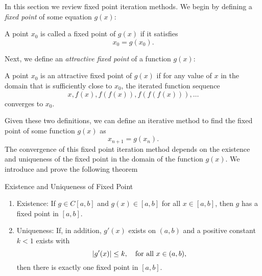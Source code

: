 In this section we review fixed point iteration methods. We begin by defining a \textit{fixed point} of some equation $g(x)$:
\begin{definition}
A point $x_{0}$ is called a fixed point of $g(x)$ if it satisfies
\begin{equation}
	x_{0} = g(x_{0}).
\end{equation}
\end{definition}
Next, we define an \textit{attractive fixed point} of a function $g(x)$:
\begin{definition}
A point $x_{0}$ is an attractive fixed point of $g(x)$ if for any value of $x$ in the domain that is sufficiently close to $x_{0}$, the iterated function sequence
\begin{equation}
	x, f(x), f(f(x)), f(f(f(x))), \dots
\end{equation}
converges to $x_{0}$.
\end{definition}
Given these two definitions, we can define an iterative method to find the fixed point of some function $g(x)$ as
\begin{equation}
x_{n+1} = g(x_{n}).
\end{equation}
The convergence of this fixed point iteration method depends on the existence and uniqueness of the fixed point in the domain of the function $g(x)$. We introduce and prove the following theorem
\begin{theorem}{Existence and Uniqueness of Fixed Point}
	\begin{enumerate}
		\item Existence: If $g \in C[a,b]$ and $g(x) \in [a,b]$ for all $x \in [a,b]$, then $g$ has a fixed point in $[a,b]$.
		\item Uniqueness: If, in addition, $g'(x)$ exists on $(a,b)$ and a positive constant $k < 1$ exists with
			\begin{equation*}
				\lvert g'(x)\rvert \leq k, \quad \text{for all } x \in (a,b),
			\end{equation*}
			then there is exactly one fixed point in $[a,b]$.
	\end{enumerate}
\end{theorem}

